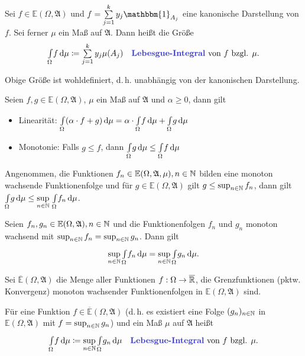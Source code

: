 \documentclass{cheat-sheet}
\newcommand{\ER}{\overline\R} %
\newcommand{\Alg}{\mathfrak{A}} %
\newcommand{\E}{\mathbb{E}} %
\newcommand{\ind}{\mathbbm{1}} %
\newcommand{\IntOmu}[1]{\Int{\Omega}{}{#1}{\mu}} %
\begin{document}
\begin{defn}
  Sei $f \in \E(\Omega, \Alg)$ und $\textstyle f = \sum_{j=1}^k y_j \ind_{A_j}$ eine kanonische Darstellung von $f$. Sei ferner $\mu$ ein Maß auf $\Alg$. Dann heißt die Größe
  \[ \IntOmu{f} \coloneqq \sum_{j=1}^k y_j \mu(A_j) \quad \text{\emph{Lebesgue-Integral} von $f$ bzgl. $\mu$.} \]
\end{defn}

\begin{bem}
  Obige Größe ist wohldefiniert, d.\,h. unabhängig von der kanonischen Darstellung.
\end{bem}

\begin{satz}
  Seien $f, g \in \E(\Omega, \Alg)$, $\mu$ ein Maß auf $\Alg$ und $\alpha \geq 0$, dann gilt
  \begin{itemize}
    \item Linearität: $\IntOmu{(\alpha \cdot f + g)} = \alpha \cdot \IntOmu{f} + \IntOmu{g}$
    \item Monotonie: Falls $g \leq f$, dann $\IntOmu{g} \leq \IntOmu{f}$
  \end{itemize}
\end{satz}

\begin{satz}
  Angenommen, die Funktionen $f_n \in \E(\Omega, \Alg, \mu), n \in \N$ bilden eine monoton wachsende Funktionenfolge und für $g \in \E(\Omega, \Alg)$ gilt $g \leq \sup_{n \in \mathbb{N}} f_n$, dann gilt $\textstyle \IntOmu{g} \leq \sup\limits_{n \in \N} \, \IntOmu{f_n}$.
\end{satz}

\begin{kor}
  Seien $f_n, g_n \in \E(\Omega, \Alg), n \in \N$ und die Funktionenfolgen $f_n$ und $g_n$ monoton wachsend mit $\sup_{n \in \mathbb{N}} f_n = \sup_{n \in \mathbb{N}} g_n$. Dann gilt
  \[ \sup_{n \in \N} \IntOmu{f_n} = \sup_{n \in \N} \IntOmu{g_n}. \]
\end{kor}

\begin{defn}
  Sei $\overline{\E}(\Omega, \Alg)$ die Menge aller Funktionen $f : \Omega \to \ER$, die Grenzfunktionen (pktw. Konvergenz) monoton wachsender Funktionenfolgen in $\E(\Omega, \Alg)$ sind.
\end{defn}

\begin{defn}
  Für eine Funktion $f \in \overline{\E}(\Omega, \Alg)$ (d.\,h. es existiert eine Folge $(g_n)_{n \in \mathbb{N}}$ in $\E(\Omega, \Alg)$ mit $f = \sup_{n \in \mathbb{N}} g_n$) und ein Maß $\mu$ auf $\Alg$ heißt
  \[ \IntOmu{f} \coloneqq \sup_{n \in \N} \IntOmu{g_n} \quad \text{\emph{Lebesgue-Integral} von $f$ bzgl. $\mu$.} \]
\end{defn}
\end{document}
